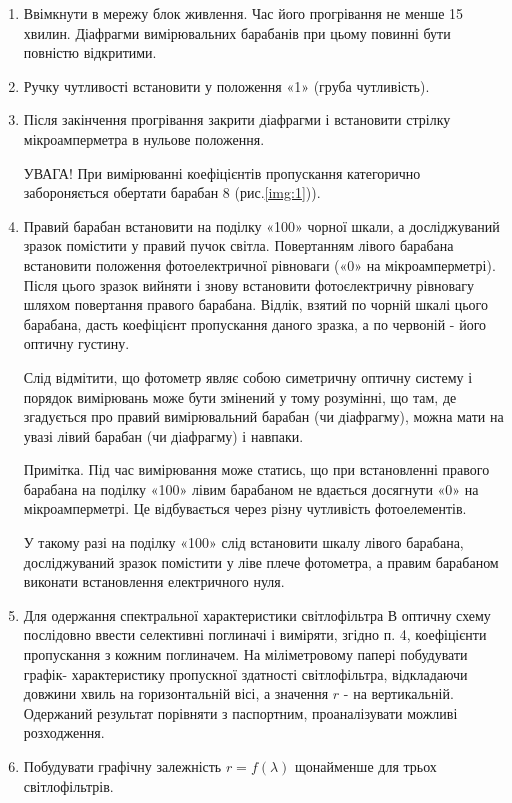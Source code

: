 \documentclass[onecolumn]{el-author}
\begin{document}
\begin{enumerate}
	\item Ввімкнути в мережу блок живлення. Час його прогрівання не
менше 15 хвилин. Діафрагми вимірювальних барабанів при
цьому повинні бути повністю відкритими.
	\item Ручку чутливості встановити у положення «1» (груба чутливість).
	\item Після закінчення прогрівання закрити діафрагми і встановити
стрілку мікроамперметра в нульове положення.

УВАГА! При вимірюванні коефіцієнтів пропускання категорично
забороняється обертати барабан 8 (рис.\ref{img:1})).
	\item Правий барабан встановити на поділку «100» чорної шкали, а
досліджуваний зразок помістити у правий пучок світла.
Повертанням лівого барабана встановити положення
фотоелектричної рівноваги («0» на мікроамперметрі). Після
цього зразок вийняти і знову встановити фотоєлектричну
рівновагу шляхом повертання правого барабана. Відлік, взятий
по чорній шкалі цього барабана, дасть коефіцієнт пропускання
даного зразка, а по червоній - його оптичну густину.

Слід відмітити, що фотометр являє собою симетричну
оптичну систему і порядок вимірювань може бути змінений у
тому розумінні, що там, де згадується про правий вимірювальний
барабан (чи діафрагму), можна мати на увазі лівий барабан (чи
діафрагму) і навпаки.

Примітка. Під час вимірювання може статись, що при
встановленні правого барабана на поділку «100» лівим барабаном
не вдається досягнути «0» на мікроамперметрі. Це відбувається
через різну чутливість фотоелементів.

У такому разі на поділку «100» слід встановити шкалу
лівого барабана, досліджуваний зразок помістити у ліве плече
фотометра, а правим барабаном виконати встановлення
електричного нуля.
	\item Для одержання спектральної характеристики світлофільтра В
оптичну схему послідовно ввести селективні поглиначі і
виміряти, згідно п. 4, коефіцієнти пропускання з кожним
поглиначем. На міліметровому папері побудувати  графік-
характеристику пропускної здатності світлофільтра, відкладаючи
довжини хвиль на горизонтальній вісі, а значення $r$ - на
вертикальній. Одержаний результат порівняти з паспортним,
проаналізувати можливі розходження.
	\item Побудувати графічну залежність $r = f(\lambda)$ щонайменше для трьох
світлофільтрів.
\end{enumerate}
\end{document}
